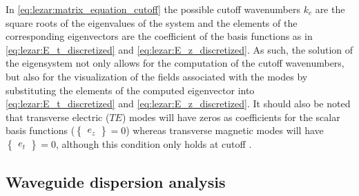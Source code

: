 In \eqref{eq:lezar:matrix_equation_cutoff} the possible cutoff
wavenumbers $k_c$ are the square roots of the eigenvalues of the system
and the elements of the corresponding eigenvectors are the coefficient
of the basis functions as in \eqref{eq:lezar:E_t_discretized}
and \eqref{eq:lezar:E_z_discretized}. As such, the solution of
the eigensystem not only allows for the computation of the cutoff
wavenumbers, but also for the visualization of the fields associated with
the modes by substituting the elements of the computed eigenvector into
\eqref{eq:lezar:E_t_discretized} and \eqref{eq:lezar:E_z_discretized}. It
should also be noted that transverse electric ($TE$) modes
will have zeros as coefficients for the scalar basis functions
($\begin{Bmatrix}e_z\end{Bmatrix} = 0$) whereas transverse magnetic
modes will have $\begin{Bmatrix}e_t\end{Bmatrix} = 0$, although this
condition only holds at cutoff \citep{Pozar2005}.

\subsection{Waveguide dispersion analysis}
\label{lezar:sec:propagation_curves}

